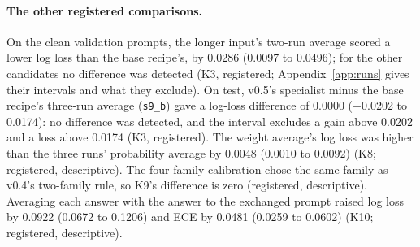 \documentclass[11pt,letterpaper]{article}
\newcommand{\sysname}[1]{\texttt{#1}}
\begin{document}
\begin{table}[t]
\centering\footnotesize
\caption{Readmission on the University of California, Irvine, Diabetes 130-US hospitals data, the 6,998 test encounters (descriptive: this test split was read in the evaluation of every version). Each cell gives the estimate and its 95 percent interval from 1,000 item resamples. ECE is the expected calibration error, whose percentile interval can lie above its estimate, since the ECE is biased upward in resamples; AUROC is the area under the receiver operating characteristic curve; it and the calibration intercept and slope are for readmission within 30 days against the rest. The calibration slope is not computed for the prior, whose prediction is the same for every encounter.}
\label{tab:readmission}
\setlength{\tabcolsep}{3.5pt}

\end{table}

\paragraph{The other registered comparisons.} On the clean validation prompts, the longer input's two-run average scored a lower log loss than the base recipe's, by 0.0286 (0.0097 to 0.0496); for the other candidates no difference was detected (K3, registered; Appendix~\ref{app:runs} gives their intervals and what they exclude). On test, v0.5's specialist minus the base recipe's three-run average (\sysname{s9\_b}) gave a log-loss difference of 0.0000 ($-$0.0202 to 0.0174): no difference was detected, and the interval excludes a gain above 0.0202 and a loss above 0.0174 (K3, registered). The weight average's log loss was higher than the three runs' probability average by 0.0048 (0.0010 to 0.0092) (K8; registered, descriptive). The four-family calibration chose the same family as v0.4's two-family rule, so K9's difference is zero (registered, descriptive). Averaging each answer with the answer to the exchanged prompt raised log loss by 0.0922 (0.0672 to 0.1206) and ECE by 0.0481 (0.0259 to 0.0602) (K10; registered, descriptive).
\end{document}
